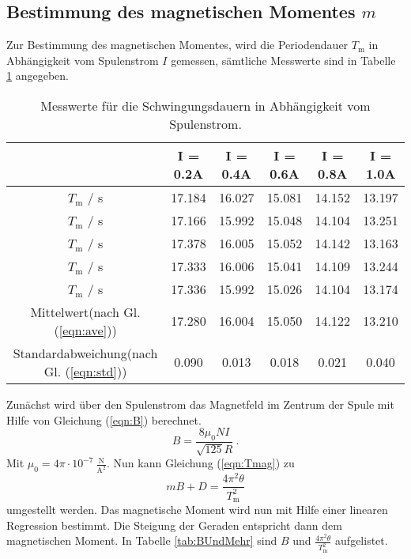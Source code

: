 \subsection{Bestimmung des magnetischen Momentes $m$}
Zur Bestimmung des magnetischen Momentes, wird die Periodendauer $T_\text{m}$ in Abhängigkeit vom Spulenstrom $I$ gemessen, sämtliche Messwerte sind in Tabelle \ref{tab:Periodendauer3} angegeben.

\begin{table}[H] %
  \centering
  \begin{tabular}{c | c | c | c | c | c}
    & I = 0.2A & I = 0.4A & I = 0.6A & I = 0.8A & I = 1.0A \\
    \midrule
    $T_\text{m}$ / s & 17.184 & 16.027 & 15.081 & 14.152 & 13.197 \\
    $T_\text{m}$ / s & 17.166 & 15.992 & 15.048 & 14.104 & 13.251 \\
    $T_\text{m}$ / s & 17.378 & 16.005 & 15.052 & 14.142 & 13.163 \\
    $T_\text{m}$ / s & 17.333 & 16.006 & 15.041 & 14.109 & 13.244 \\
    $T_\text{m}$ / s & 17.336 & 15.992 & 15.026 & 14.104 & 13.174 \\
    \bottomrule
    Mittelwert(nach Gl. (\ref{eqn:ave})) & 17.280 & 16.004 & 15.050 & 14.122 & 13.210 \\
    Standardabweichung(nach Gl. (\ref{eqn:std})) & 0.090 & 0.013 & 0.018 & 0.021 & 0.040 \\
    \bottomrule
  \end{tabular}
  \caption{Messwerte für die Schwingungsdauern in Abhängigkeit vom Spulenstrom.}
  \label{tab:Periodendauer3}
\end{table}

Zunächst wird über den Spulenstrom das Magnetfeld im Zentrum der Spule mit Hilfe von Gleichung (\ref{eqn:B}) berechnet.
\begin{equation}
  B = \frac{8 \mu_0 N I}{\sqrt{125}R} \ .
  \label{eqn:B}
\end{equation}
Mit $\mu_0 = 4 \pi \cdot 10^{-7} \ \frac{\text{N}}{\text{A}^2}$.
Nun kann Gleichung (\ref{eqn:Tmag}) zu
\begin{equation}
  mB + D = \frac{4 \pi^2 \theta}{T_\text{m}^2}
  \label{eqn:MagMoment}
\end{equation}
umgestellt werden. Das magnetische Moment wird nun mit Hilfe einer linearen Regression bestimmt. Die Steigung der Geraden entspricht dann dem magnetischen Moment. In Tabelle \ref{tab:BUndMehr} sind $B$ und $\frac{4 \pi^2 \theta}{T_\text{m}^2}$ aufgelistet.

